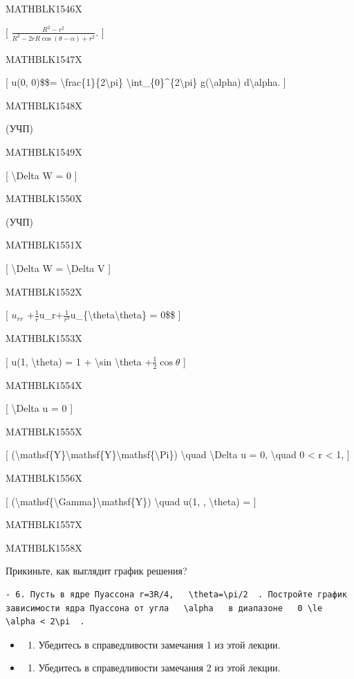 \documentclass[
]{article}
\providecommand{\tightlist}{%
  \setlength{\itemsep}{0pt}\setlength{\parskip}{0pt}}
\begin{document}
{{{MATHBLK1546X

{[} \(\frac{R^2-r^2}{R^2-2rR\cos(\theta-\alpha)+r^2}\). {]}

MATHBLK1547X

{[} u(0, 0)\$\$= \textbackslash frac\{1\}\{2\textbackslash pi\}
\textbackslash int\_\{0\}\^{}\{2\textbackslash pi\}
g(\textbackslash alpha) d\textbackslash alpha. {]}

MATHBLK1548X

(УЧП)

MATHBLK1549X

{[} \textbackslash Delta W = 0 {]}

MATHBLK1550X

(УЧП)

MATHBLK1551X

{[} \textbackslash Delta W = \textbackslash Delta V {]}

MATHBLK1552X

{[} \(u_{rr}\)
+\(\frac{1}{r}\)u\_r\(+ \frac{1}{r^3}\)u\_\{\textbackslash theta\textbackslash theta\}
= 0\$\$ {]}

MATHBLK1553X

{[} u(1, \textbackslash theta) = 1 + \textbackslash sin
\textbackslash theta +\(\frac{1}{2} \cos \theta\) {]}

MATHBLK1554X

{[} \textbackslash Delta u = 0 {]}

MATHBLK1555X

{[}
(\textbackslash mathsf\{Y\}\textbackslash mathsf\{Y\}\textbackslash mathsf\{\textbackslash Pi\})
\textbackslash quad \textbackslash Delta u = 0, \textbackslash quad 0
\textless{} r \textless{} 1, {]}

MATHBLK1556X

{[}
(\textbackslash mathsf\{\textbackslash Gamma\}\textbackslash mathsf\{Y\})
\textbackslash quad u(1, , \textbackslash theta) = {]}

MATHBLK1557X

MATHBLK1558X

Прикиньте, как выглядит график решения?

\begin{verbatim}
- 6. Пусть в ядре Пуассона r=3R/4,   \theta=\pi/2  . Постройте график зависимости ядра Пуассона от угла   \alpha   в диапазоне   0 \le \alpha < 2\pi  .
\end{verbatim}

\begin{itemize}
\tightlist
\item
  \begin{enumerate}
  \def\labelenumi{\arabic{enumi}.}
  \setcounter{enumi}{6}
  \tightlist
  \item
    Убедитесь в справедливости замечания 1 из этой лекции.
  \end{enumerate}
\item
  \begin{enumerate}
  \def\labelenumi{\arabic{enumi}.}
  \setcounter{enumi}{7}
  \tightlist
  \item
    Убедитесь в справедливости замечания 2 из этой лекции.
  \end{enumerate}
\end{itemize}

}}}
\end{document}
